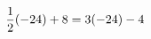 \documentclass[preview]{standalone}
\begin{document}
\begin{align*}
\special{dvisvgm:raw <g id='unique000'>}\frac{1}{2} (-24) + 8 = 3(-24) - 4\special{dvisvgm:raw </g>}
\end{align*}
\end{document}
